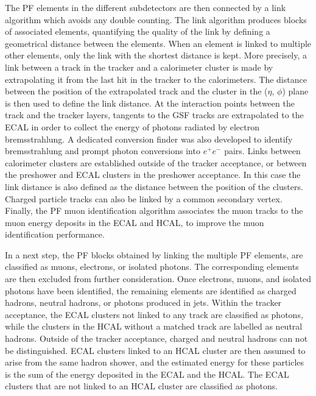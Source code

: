 The \ac{PF} elements in the different subdetectors are then connected by a link algorithm which avoids any double counting. The link algorithm produces blocks of associated elements, quantifying the quality of the link by defining a geometrical distance between the elements. When an element is linked to multiple other elements, only the link with the shortest distance is kept. More precisely, a link between a track in the tracker and a calorimeter cluster is made by extrapolating it from the last hit in the tracker to the calorimeters. The distance between the position of the extrapolated track and the cluster in the ($\eta$, $\phi$) plane is then used to define the link distance. At the interaction points between the track and the tracker layers, tangents to the \ac{GSF} tracks are extrapolated to the \ac{ECAL} in order to collect the energy of photons radiated by electron bremsstrahlung. A dedicated conversion finder was also developed to identify bremsstrahlung and prompt photon conversions into $e^+e^-$ pairs. Links between calorimeter clusters are established outside of the tracker acceptance, or between the preshower and \ac{ECAL} clusters in the preshower acceptance. In this case the link distance is also defined as the distance between the position of the clusters. Charged particle tracks can also be linked by a common secondary vertex. Finally, the \ac{PF} muon identification algorithm associates the muon tracks to the muon energy deposits in the \ac{ECAL} and \ac{HCAL}, to improve the muon identification performance.

In a next step, the \ac{PF} blocks obtained by linking the multiple \ac{PF} elements, are classified as muons, electrons, or isolated photons. The corresponding elements are then excluded from further consideration. Once electrons, muons, and isolated photons have been identified, the remaining elements are identified as charged hadrons, neutral hadrons, or photons produced in jets. Within the tracker acceptance, the \ac{ECAL} clusters not linked to any track are classified as photons, while the clusters in the \ac{HCAL} without a matched track are labelled as neutral hadrons. Outside of the tracker acceptance, charged and neutral hadrons can not be distinguished. \ac{ECAL} clusters linked to an \ac{HCAL} cluster are then assumed to arise from the same hadron shower, and the estimated energy for these particles is the sum of the energy deposited in the \ac{ECAL} and the \ac{HCAL}. The \ac{ECAL} clusters that are not linked to an \ac{HCAL} cluster are classified as photons.

